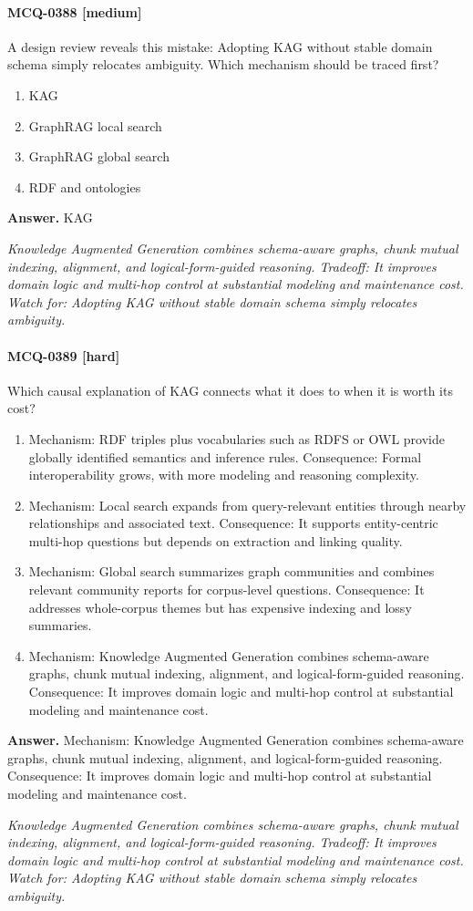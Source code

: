 \paragraph{MCQ-0388 [medium]} A design review reveals this mistake: Adopting KAG without stable domain schema simply relocates ambiguity. Which mechanism should be traced first?
\begin{enumerate}[label=\Alph*.]
\item KAG
\item GraphRAG local search
\item GraphRAG global search
\item RDF and ontologies
\end{enumerate}
\noindent\textbf{Answer.} KAG
\par\textit{Knowledge Augmented Generation combines schema-aware graphs, chunk mutual indexing, alignment, and logical-form-guided reasoning. Tradeoff: It improves domain logic and multi-hop control at substantial modeling and maintenance cost. Watch for: Adopting KAG without stable domain schema simply relocates ambiguity.}
\paragraph{MCQ-0389 [hard]} Which causal explanation of KAG connects what it does to when it is worth its cost?
\begin{enumerate}[label=\Alph*.]
\item Mechanism: RDF triples plus vocabularies such as RDFS or OWL provide globally identified semantics and inference rules. Consequence: Formal interoperability grows, with more modeling and reasoning complexity.
\item Mechanism: Local search expands from query-relevant entities through nearby relationships and associated text. Consequence: It supports entity-centric multi-hop questions but depends on extraction and linking quality.
\item Mechanism: Global search summarizes graph communities and combines relevant community reports for corpus-level questions. Consequence: It addresses whole-corpus themes but has expensive indexing and lossy summaries.
\item Mechanism: Knowledge Augmented Generation combines schema-aware graphs, chunk mutual indexing, alignment, and logical-form-guided reasoning. Consequence: It improves domain logic and multi-hop control at substantial modeling and maintenance cost.
\end{enumerate}
\noindent\textbf{Answer.} Mechanism: Knowledge Augmented Generation combines schema-aware graphs, chunk mutual indexing, alignment, and logical-form-guided reasoning. Consequence: It improves domain logic and multi-hop control at substantial modeling and maintenance cost.
\par\textit{Knowledge Augmented Generation combines schema-aware graphs, chunk mutual indexing, alignment, and logical-form-guided reasoning. Tradeoff: It improves domain logic and multi-hop control at substantial modeling and maintenance cost. Watch for: Adopting KAG without stable domain schema simply relocates ambiguity.}
